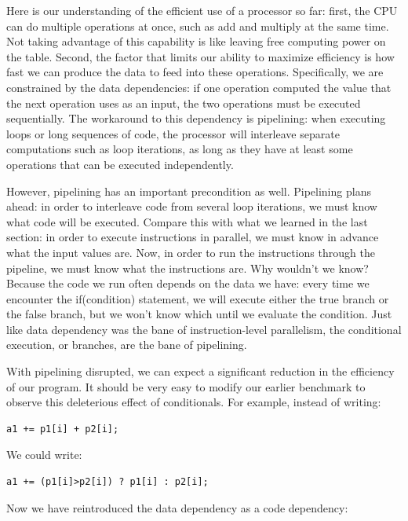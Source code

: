 Here is our understanding of the efficient use of a processor so far: first, the CPU can do multiple operations at once, such as add and multiply at the same time. Not taking advantage of this capability is like leaving free computing power on the table. Second, the factor that limits our ability to maximize efficiency is how fast we can produce the data to feed into these operations. Specifically, we are constrained by the data dependencies: if one operation computed the value that the next operation uses as an input, the two operations must be executed sequentially. The workaround to this dependency is pipelining: when executing loops or long sequences of code, the processor will interleave separate computations such as loop iterations, as long as they have at least some operations that can be executed independently. 

However, pipelining has an important precondition as well. Pipelining plans ahead: in order to interleave code from several loop iterations, we must know what code will be executed. Compare this with what we learned in the last section: in order to execute instructions in parallel, we must know in advance what the input values are. Now, in order to run the instructions through the pipeline, we must know what the instructions are. Why wouldn't we know? Because the code we run often depends on the data we have: every time we encounter the if(condition) statement, we will execute either the true branch or the false branch, but we won't know which until we evaluate the condition. Just like data dependency was the bane of instruction-level parallelism, the conditional execution, or branches, are the bane of pipelining.

With pipelining disrupted, we can expect a significant reduction in the efficiency of our program. It should be very easy to modify our earlier benchmark to observe this deleterious effect of conditionals. For example, instead of writing:

\begin{lstlisting}[style=styleCXX]
a1 += p1[i] + p2[i];
\end{lstlisting}

We could write:

\begin{lstlisting}[style=styleCXX]
a1 += (p1[i]>p2[i]) ? p1[i] : p2[i];
\end{lstlisting}

Now we have reintroduced the data dependency as a code dependency:

